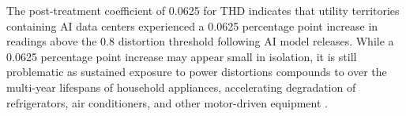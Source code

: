 \documentclass[a4paper,fleqn,longmktitle]{cas-sc}
\newcommand{\nb}[1]{\textcolor{blue}{NB[#1]}}
\theoremstyle{plain}
\theoremstyle{definition}
\begin{document}
The post-treatment coefficient of 0.0625 for THD indicates that utility territories containing AI data centers experienced a 0.0625 percentage point increase in readings above the 0.8 distortion threshold following AI model releases. 
While a 0.0625 percentage point increase may appear small in isolation, it is still problematic as sustained exposure to power distortions compounds to over the multi-year lifespans of household appliances, accelerating degradation of refrigerators, air conditioners, and other motor-driven equipment \cite{NEMA_MG1,Laughner2024THD}.


\end{document}
